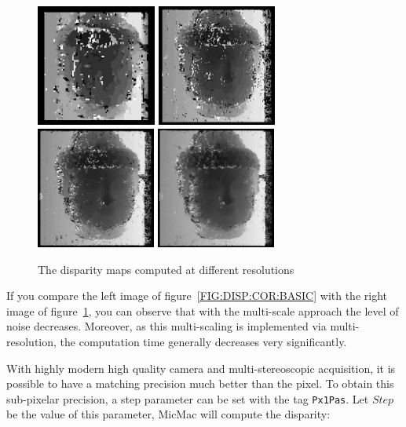 \begin{figure}
\includegraphics[height=40mm]{FIGS/Boudhas/Px1_MR_Num1.jpg}
\includegraphics[height=40mm]{FIGS/Boudhas/Px1_MR_Num2.jpg}
\includegraphics[height=40mm]{FIGS/Boudhas/Px1_MR_Num3.jpg}
\includegraphics[height=40mm]{FIGS/Boudhas/Px1_MR_Num4.jpg}
\caption{The disparity maps computed at different resolutions}
\label{FIG:DISP:MUL:RES}
\end{figure}



If you compare the left image of figure~\ref{FIG:DISP:COR:BASIC} with the
right image of figure~\ref{FIG:DISP:MUL:RES}, you can observe that with the
multi-scale approach the level of noise decreases.  Moreover, as this
multi-scaling is implemented via multi-resolution, the computation time
generally decreases very significantly.


With highly modern high quality camera and multi-stereoscopic acquisition,
it is possible to have a matching precision much better than the pixel.
To obtain  this sub-pixelar precision, a step parameter can be set with
the tag  {\tt Px1Pas}. Let $Step$ be the value of this parameter,
MicMac will compute the disparity:

